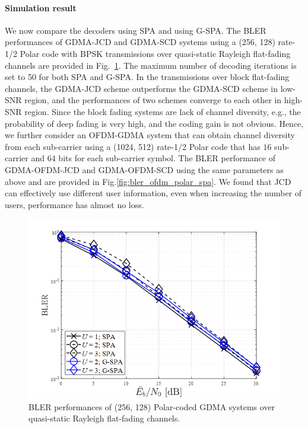 \paragraph{Simulation result}

 We now compare the decoders using SPA and using G-SPA. The BLER performances of GDMA-JCD and GDMA-SCD systems using a (256, 128) rate-1/2 Polar code with BPSK transmissions over quasi-static Rayleigh flat-fading channels are provided in Fig.~\ref{fig:bler_polar_spa}. The maximum number of decoding iterations is set to 50 for both SPA and G-SPA. In the transmissions over block flat-fading channels, the GDMA-JCD scheme outperforms the GDMA-SCD scheme in low-SNR region, and the performances of two schemes converge to each other in high-SNR region. Since the block fading systems are lack of channel diversity, e.g., the probability of deep fading is very high, and the coding gain is not obvious. Hence, we further consider an OFDM-GDMA system that can obtain channel diversity from each sub-carrier using a (1024, 512) rate-1/2 Polar code that has $16$ sub-carrier and $64$ bits for each sub-carrier symbol. The BLER performance of GDMA-OFDM-JCD and GDMA-OFDM-SCD using the same parameters as above and are provided in Fig.\ref{fig:bler_ofdm_polar_spa}. We found that JCD can effectively use different user information, even when increasing the number of users, performance has almost no loss.

\begin{figure}[H]
 \centering
 \includegraphics[width=14cm]{fig/bler_polar_spa.png}
 \caption{BLER performances of (256, 128) Polar-coded GDMA systems over quasi-static Rayleigh flat-fading channels.}
 \label{fig:bler_polar_spa}
\end{figure}

